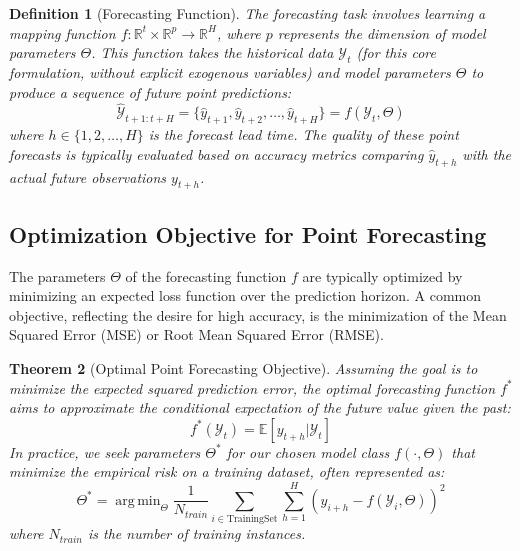 \documentclass[review,3p,times]{elsarticle}
\DeclareMathOperator*{\argmin}{arg\,min}
\newtheorem{definition}{Definition}[section]
\newtheorem{theorem}[definition]{Theorem}
\begin{document}
\begin{definition}[Forecasting Function]
The forecasting task involves learning a mapping function $f: \mathbb{R}^t \times \mathbb{R}^p \rightarrow \mathbb{R}^H$, where $p$ represents the dimension of model parameters $\Theta$. This function takes the historical data $\mathcal{Y}_t$ (for this core formulation, without explicit exogenous variables) and model parameters $\Theta$ to produce a sequence of future point predictions:
\begin{equation}
    \hat{\mathcal{Y}}_{t+1:t+H} = \{\hat{y}_{t+1}, \hat{y}_{t+2}, \dots, \hat{y}_{t+H}\} = f(\mathcal{Y}_t, \Theta)
\end{equation}
where $h \in \{1, 2, \dots, H\}$ is the forecast lead time. The quality of these point forecasts is typically evaluated based on accuracy metrics comparing $\hat{y}_{t+h}$ with the actual future observations $y_{t+h}$.
\end{definition}

\subsection{Optimization Objective for Point Forecasting}

The parameters $\Theta$ of the forecasting function $f$ are typically optimized by minimizing an expected loss function over the prediction horizon. A common objective, reflecting the desire for high accuracy, is the minimization of the Mean Squared Error (MSE) or Root Mean Squared Error (RMSE).

\begin{theorem}[Optimal Point Forecasting Objective]
Assuming the goal is to minimize the expected squared prediction error, the optimal forecasting function $f^*$ aims to approximate the conditional expectation of the future value given the past:
\begin{equation}
    f^*(\mathcal{Y}_t) = \mathbb{E}[y_{t+h} | \mathcal{Y}_t]
\end{equation}
In practice, we seek parameters $\Theta^*$ for our chosen model class $f(\cdot, \Theta)$ that minimize the empirical risk on a training dataset, often represented as:
\begin{equation}
    \Theta^* = \argmin_\Theta \frac{1}{N_{train}} \sum_{i \in \text{TrainingSet}} \sum_{h=1}^{H} (y_{i+h} - f(\mathcal{Y}_i, \Theta))^2
\end{equation}
where $N_{train}$ is the number of training instances.
\end{theorem}
\end{document}
